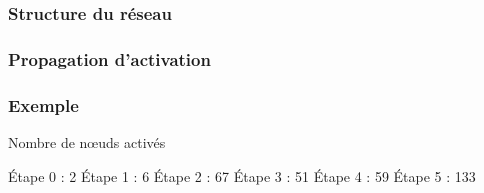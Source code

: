 \documentclass[12pt]{beamer}
\begin{document}
\begin{frame}[allowframebreaks = 0.7]
 \frametitle{Structure du réseau}
 
 
\end{frame}

\begin{frame}
 \frametitle{Propagation d'activation}
 
 
\end{frame}

\begin{frame}
  \frametitle{Exemple}
  
  \begin{block}{Nombre de n\oe uds activés}
   \begin{overprint}
 Étape 0 : 2
 Étape 1 : 6
 Étape 2 : 67
 Étape 3 : 51
 Étape 4 : 59
 Étape 5 : 133
\end{overprint}
  \end{block}


\end{frame}
\end{document}
